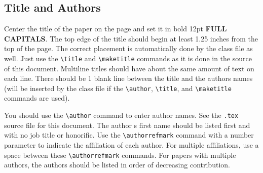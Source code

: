 \documentclass{article}
\begin{document}
\subsection{Title and Authors}

Center the title of the paper on the page and set it in bold 12pt \textbf{\uppercase{full capitals}}. The top edge of the title should begin at least 1.25 inches from the top of the page. The correct placement is automatically done by the class file as well. Just use the \verb+\title+ and \verb+\maketitle+ commands as it is done in the source of this document. Multiline titles should have about the same amount of text on each line. There should be 1 blank line between the title and the authors  names (will be inserted by the class file if the \verb+\author+, \verb+\title+, and \verb+\maketitle+ commands are used).


You should use the \verb+\author+ command to enter author names. See the \texttt{.tex} source file for this document. The author s first name should be listed first and with no job title or honorific. Use the \verb+\authorrefmark+ command with a number parameter to indicate the affiliation of each author. For multiple affiliations, use a space between these \verb+\authorrefmark+ commands. For papers with multiple authors, the authors should be listed in order of decreasing contribution.
\end{document}
